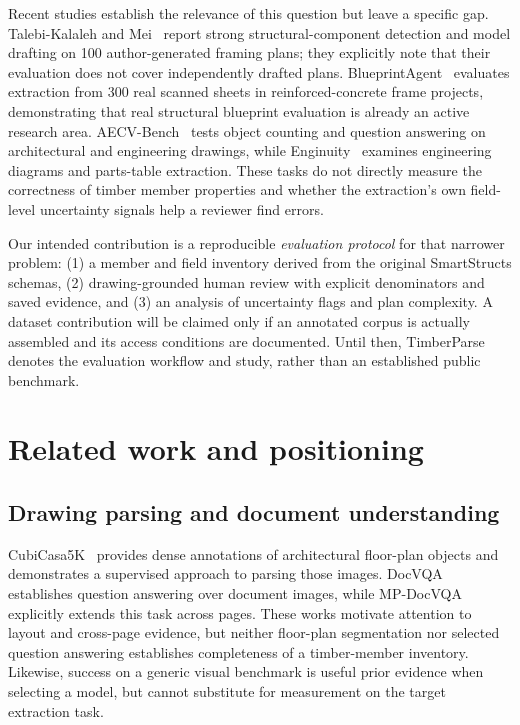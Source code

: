 \documentclass[11pt]{article}
\begin{document}
Recent studies establish the relevance of this question but leave a specific gap. Talebi-Kalaleh and Mei~\cite{talebi2026} report strong structural-component detection and model drafting on 100 author-generated framing plans; they explicitly note that their evaluation does not cover independently drafted plans. BlueprintAgent~\cite{xu2026} evaluates extraction from 300 real scanned sheets in reinforced-concrete frame projects, demonstrating that real structural blueprint evaluation is already an active research area. AECV-Bench~\cite{kondratenko2026} tests object counting and question answering on architectural and engineering drawings, while Enginuity~\cite{kumar2026} examines engineering diagrams and parts-table extraction. These tasks do not directly measure the correctness of timber member properties and whether the extraction's own field-level uncertainty signals help a reviewer find errors.

Our intended contribution is a reproducible \emph{evaluation protocol} for that narrower problem: (1) a member and field inventory derived from the original SmartStructs schemas, (2) drawing-grounded human review with explicit denominators and saved evidence, and (3) an analysis of uncertainty flags and plan complexity. A dataset contribution will be claimed only if an annotated corpus is actually assembled and its access conditions are documented. Until then, TimberParse denotes the evaluation workflow and study, rather than an established public benchmark.

\section{Related work and positioning}
\subsection{Drawing parsing and document understanding}
CubiCasa5K~\cite{kalervo2019} provides dense annotations of architectural floor-plan objects and demonstrates a supervised approach to parsing those images. DocVQA~\cite{mathew2021} establishes question answering over document images, while MP-DocVQA~\cite{tito2023} explicitly extends this task across pages. These works motivate attention to layout and cross-page evidence, but neither floor-plan segmentation nor selected question answering establishes completeness of a timber-member inventory. Likewise, success on a generic visual benchmark is useful prior evidence when selecting a model, but cannot substitute for measurement on the target extraction task.
\end{document}
